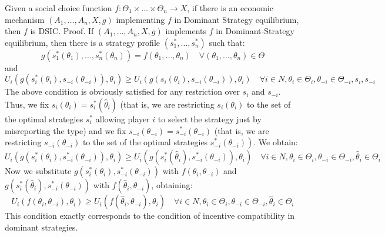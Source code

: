 Given a social choice function $f: \Theta_{1} \times \ldots \times \Theta_{n} \rightarrow X$, if there is an economic mechanism $\left(A_{1}, \ldots, A_{n}, X, g\right)$ implementing $f$ in Dominant Strategy equilibrium, then $f$ is DSIC.
Proof. If $\left(A_{1}, \ldots, A_{n}, X, g\right)$ implements $f$ in Dominant-Strategy equilibrium, then there is a strategy profile $\left(s_{1}^{*}, \ldots, s_{n}^{*}\right)$ such that:
$$
g\left(s_{1}^{*}\left(\theta_{1}\right), \ldots, s_{n}^{*}\left(\theta_{n}\right)\right)=f\left(\theta_{1}, \ldots, \theta_{n}\right) \quad \forall\left(\theta_{1}, \ldots, \theta_{n}\right) \in \Theta
$$
and
$$
U_{i}\left(g\left(s_{i}^{*}\left(\theta_{i}\right), s_{-i}\left(\theta_{-i}\right)\right), \theta_{i}\right) \geqslant U_{i}\left(g\left(s_{i}\left(\theta_{i}\right), s_{-i}\left(\theta_{-i}\right)\right), \theta_{i}\right) \quad \forall i \in N, \theta_{i} \in \Theta_{i}, \theta_{-i} \in \Theta_{-i}, s_{i}, s_{-i}
$$
The above condition is obviously satisfied for any restriction over $s_{i}$ and $s_{-i} .$ Thus, we fix $s_{i}\left(\theta_{i}\right)=s_{i}^{*}\left(\hat{\theta}_{i}\right)$ (that is, we are restricting $s_{i}\left(\theta_{i}\right)$ to the set of the optimal strategies $s_{i}^{*}$ allowing player $i$ to select the strategy just by misreporting the type) and we fix $s_{-i}\left(\theta_{-i}\right)=s_{-i}^{*}\left(\theta_{-i}\right)$ (that is, we are restricting $s_{-i}\left(\theta_{-i}\right)$ to the set of the optimal strategies $\left.s_{-i}^{*}\left(\theta_{-i}\right)\right)$. We obtain:
$$
U_{i}\left(g\left(s_{i}^{*}\left(\theta_{i}\right), s_{-i}^{*}\left(\theta_{-i}\right)\right), \theta_{i}\right) \geqslant U_{i}\left(g\left(s_{i}^{*}\left(\hat{\theta}_{i}\right), s_{-i}^{*}\left(\theta_{-i}\right)\right), \theta_{i}\right) \quad \forall i \in N, \theta_{i} \in \Theta_{i}, \theta_{-i} \in \Theta_{-i}, \hat{\theta}_{i} \in \Theta_{i}
$$
Now we substitute $g\left(s_{i}^{*}\left(\theta_{i}\right), s_{-i}^{*}\left(\theta_{-i}\right)\right)$ with $f\left(\theta_{i}, \theta_{-i}\right)$ and $g\left(s_{i}^{*}\left(\hat{\theta}_{i}\right), s_{-i}^{*}\left(\theta_{-i}\right)\right)$ with $f\left(\hat{\theta}_{i}, \theta_{-i}\right)$, obtaining:
$$
U_{i}\left(f\left(\theta_{i}, \theta_{-i}\right), \theta_{i}\right) \geqslant U_{i}\left(f\left(\hat{\theta}_{i}, \theta_{-i}\right), \theta_{i}\right) \quad \forall i \in N, \theta_{i} \in \Theta_{i}, \theta_{-i} \in \Theta_{-i}, \hat{\theta}_{i} \in \Theta_{i}
$$
This condition exactly corresponds to the condition of incentive compatibility in dominant strategies.\\

